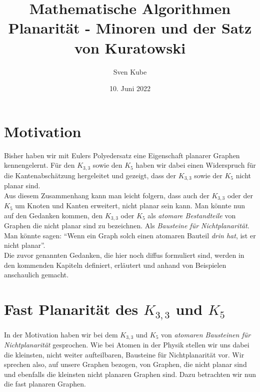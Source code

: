 \documentclass[a4paper]{article}
\title{Mathematische Algorithmen\\ Planarität - Minoren und der Satz von Kuratowski}
\author{Sven Kube }
\date{10. Juni 2022}
\begin{document}
\maketitle
{}

\vspace{2cm}

\tableofcontents


\newpage

\section{Motivation}
Bisher haben wir mit Eulers Polyedersatz eine Eigenschaft planarer Graphen kennengelernt.
Für den $K_{3,3}$ sowie den $K_5$ haben wir dabei einen Widerspruch für die Kantenabschätzung hergeleitet und gezeigt, dass der $K_{3,3}$ sowie der $K_5$ nicht planar sind.\\

Aus diesem Zusammenhang kann man leicht folgern, dass auch der $K_{3,3}$ oder der $K_5$ um Knoten und Kanten erweitert, nicht planar sein kann.
Man könnte nun auf den Gedanken kommen, den $K_{3,3}$ oder $K_5$ als \textit{atomare Bestandteile} von Graphen die nicht planar sind zu bezeichnen.
Als \textit{Bausteine für Nichtplanarität}.
Man könnte sagen: \enquote{Wenn ein Graph solch einen atomaren Bauteil \textit{drin hat}, ist er nicht planar}.\\

Die zuvor genannten Gedanken, die hier noch diffus formuliert sind, werden in den kommenden Kapiteln definiert, erläutert und anhand von Beispielen anschaulich gemacht. 

\section{Fast Planarität des $K_{3,3}$ und $K_5$}
In der Motivation haben wir bei dem $K_{3,3}$ und $K_5$ von \textit{atomaren Bausteinen für Nichtplanarität} gesprochen.
Wie bei Atomen in der Physik stellen wir uns dabei die kleinsten, nicht weiter aufteilbaren, Bausteine für Nichtplanarität vor.
Wir sprechen also, auf unsere Graphen bezogen, von Graphen, die nicht planar sind und ebenfalls die kleinsten nicht planaren Graphen sind.
Dazu betrachten wir nun die fast planaren Graphen.\\
\end{document}
